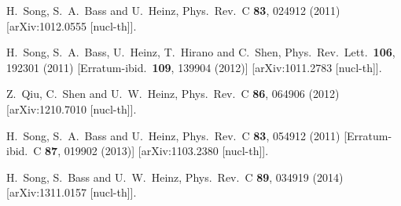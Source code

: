 \begin{thebibliography}{99}
  H.~Song, S.~A.~Bass and U.~Heinz,
  Phys.\ Rev.\ C {\bf 83}, 024912 (2011)
  [arXiv:1012.0555 [nucl-th]].
  
  H.~Song, S.~A.~Bass, U.~Heinz, T.~Hirano and C.~Shen,
  Phys.\ Rev.\ Lett.\  {\bf 106}, 192301 (2011)
  [Erratum-ibid.\  {\bf 109}, 139904 (2012)]
  [arXiv:1011.2783 [nucl-th]].
  
  Z.~Qiu, C.~Shen and U.~W.~Heinz,
  Phys.\ Rev.\ C {\bf 86}, 064906 (2012)
  [arXiv:1210.7010 [nucl-th]].
  
  H.~Song, S.~A.~Bass and U.~Heinz,
  Phys.\ Rev.\ C {\bf 83}, 054912 (2011)
  [Erratum-ibid.\ C {\bf 87}, 019902 (2013)]
  [arXiv:1103.2380 [nucl-th]].
  
  H.~Song, S.~Bass and U.~W.~Heinz,
  Phys.\ Rev.\ C {\bf 89}, 034919 (2014)
  [arXiv:1311.0157 [nucl-th]].
  

\end{thebibliography}

